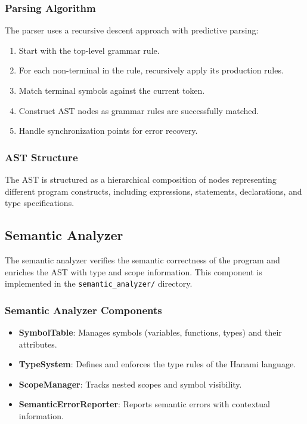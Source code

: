 \documentclass[conference]{IEEEtran}
\begin{document}
\subsubsection{Parsing Algorithm}
The parser uses a recursive descent approach with predictive parsing:
\begin{enumerate}
    \item Start with the top-level grammar rule.
    \item For each non-terminal in the rule, recursively apply its production rules.
    \item Match terminal symbols against the current token.
    \item Construct AST nodes as grammar rules are successfully matched.
    \item Handle synchronization points for error recovery.
\end{enumerate}

\subsubsection{AST Structure}
The AST is structured as a hierarchical composition of nodes representing different program constructs, including expressions, statements, declarations, and type specifications.

\subsection{Semantic Analyzer}
The semantic analyzer verifies the semantic correctness of the program and enriches the AST with type and scope information. This component is implemented in the \texttt{semantic\_analyzer/} directory.

\subsubsection{Semantic Analyzer Components}
\begin{itemize}
    \item \textbf{SymbolTable}: Manages symbols (variables, functions, types) and their attributes.
    \item \textbf{TypeSystem}: Defines and enforces the type rules of the Hanami language.
    \item \textbf{ScopeManager}: Tracks nested scopes and symbol visibility.
    \item \textbf{SemanticErrorReporter}: Reports semantic errors with contextual information.
\end{itemize}
\end{document}

